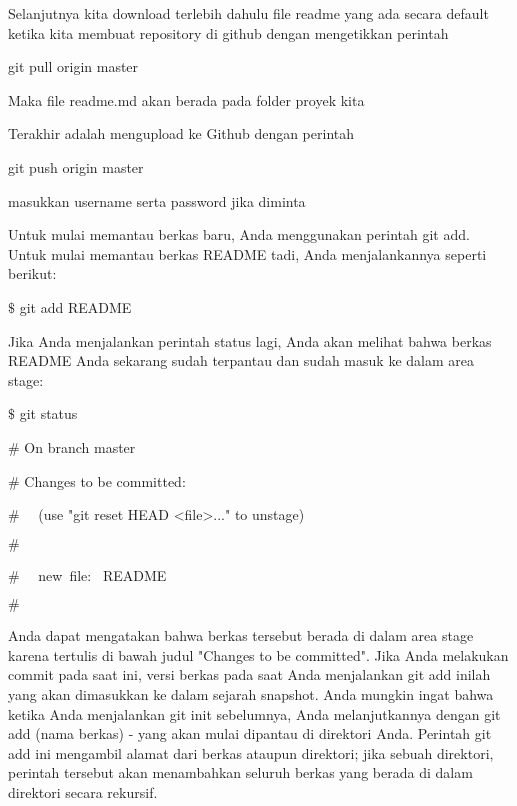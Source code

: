 \noindent 
Selanjutnya kita download terlebih dahulu file readme yang ada secara default ketika kita membuat repository di github dengan mengetikkan perintah \par
\noindent 
git pull origin master \par
\noindent 
Maka file readme.md akan berada pada folder proyek kita \par
\vspace{12pt}
\noindent 
Terakhir adalah mengupload ke Github dengan perintah \par
\noindent 
git push origin master \par
\noindent 
masukkan username serta password jika diminta \par

 \par
\noindent 
Untuk mulai memantau berkas baru, Anda menggunakan perintah $  $git add. Untuk mulai memantau berkas README tadi, Anda menjalankannya seperti berikut: \par
\noindent 
 $  \$  $ git add README \par
\noindent 
Jika Anda menjalankan perintah $  $status $  $lagi, Anda akan melihat bahwa berkas README Anda sekarang sudah terpantau dan sudah masuk ke dalam area stage: \par
\noindent 
 $  \$  $ git status \par
\noindent 
 $  \#  $ On branch master \par
\noindent 
 $  \#  $ Changes to be committed: \par
\noindent 
 $  \#  $~~ (use "git reset HEAD <file>..." to unstage) \par
\noindent 
 $  \#  $ \par
\noindent 
 $  \#  $~~ new~file:~  README \par
\noindent 
 $  \#  $ \par
\noindent 
Anda dapat mengatakan bahwa berkas tersebut berada di dalam area stage karena tertulis di bawah judul "Changes to be committed". Jika Anda melakukan commit pada saat ini, versi berkas pada saat Anda menjalankan $  $git add $  $inilah yang akan dimasukkan ke dalam sejarah snapshot. Anda mungkin ingat bahwa ketika Anda menjalankan $  $git init $  $sebelumnya, Anda melanjutkannya dengan $  $git add (nama berkas) $  $- yang akan mulai dipantau di direktori Anda. Perintah $  $git add $  $ini mengambil alamat dari berkas ataupun direktori; jika sebuah direktori, perintah tersebut akan menambahkan seluruh berkas yang berada di dalam direktori secara rekursif. \par

